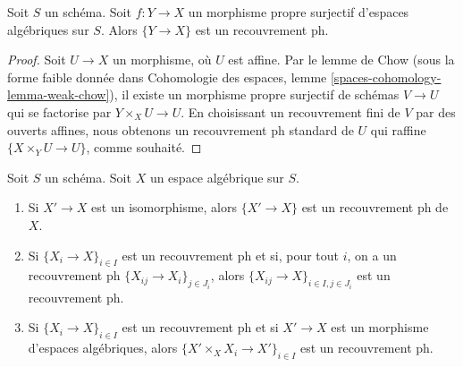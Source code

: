 \begin{lemma}
\label{lemma-surjective-proper-ph}
Soit $S$ un schéma. Soit $f : Y \to X$ un morphisme propre surjectif
d'espaces algébriques sur $S$. Alors $\{Y \to X\}$ est un recouvrement ph.
\end{lemma}

\begin{proof}
Soit $U \to X$ un morphisme, où $U$ est affine.
Par le lemme de Chow (sous la forme faible donnée dans
Cohomologie des espaces, lemme \ref{spaces-cohomology-lemma-weak-chow}),
il existe un morphisme propre surjectif de schémas
$V \to U$ qui se factorise par $Y \times_X U \to U$.
En choisissant un recouvrement fini de $V$ par des ouverts affines, nous obtenons un
recouvrement ph standard de $U$ qui raffine $\{X \times_Y U \to U\}$,
comme souhaité.
\end{proof}

\begin{lemma}
\label{lemma-ph}
Soit $S$ un schéma. Soit $X$ un espace algébrique sur $S$.
\begin{enumerate}
\item Si $X' \to X$ est un isomorphisme, alors $\{X' \to X\}$
est un recouvrement ph de $X$.
\item Si $\{X_i \to X\}_{i\in I}$ est un recouvrement ph et si, pour tout
$i$, on a un recouvrement ph $\{X_{ij} \to X_i\}_{j\in J_i}$, alors
$\{X_{ij} \to X\}_{i \in I, j\in J_i}$ est un recouvrement ph.
\item Si $\{X_i \to X\}_{i\in I}$ est un recouvrement ph
et si $X' \to X$ est un morphisme d'espaces algébriques, alors
$\{X' \times_X X_i \to X'\}_{i\in I}$ est un recouvrement ph.
\end{enumerate}
\end{lemma}

